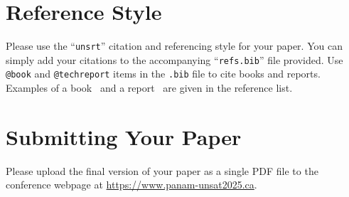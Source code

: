 \documentclass[letter,12pt]{article}
\begin{document}
\section*{Reference Style}
Please use the ``\verb|unsrt|'' citation and referencing style for your paper. You can simply add your citations to the accompanying ``\verb|refs.bib|'' file provided. Use \verb|@book| and \verb|@techreport| items in the \verb|.bib| file to cite books and reports. Examples of a book~\cite{fredlund1993soil} and a report~\cite{evans1983unsaturated} are given in the reference list.

\section*{Submitting Your Paper}
Please upload the final version of your paper as a single PDF file to the conference webpage at \url{https://www.panam-unsat2025.ca}.


\smallskip
\parindent=0pt





\end{document}
